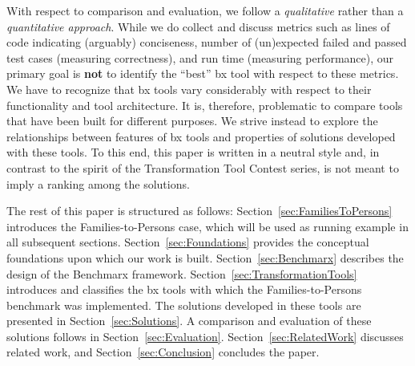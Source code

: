 With respect to comparison and evaluation, we follow a \emph{qualitative} rather than a \emph{quantitative approach}. 
While we do collect and discuss metrics such as lines of code indicating (arguably) conciseness, number of (un)expected failed and passed test cases (measuring correctness), and run time (measuring performance), our primary goal is \textbf{not} to identify the ``best'' bx tool with respect to these metrics. 
We have to recognize that bx tools vary considerably with respect to their functionality and tool architecture. 
It is, therefore, problematic to compare tools that have been built for different purposes. 
We strive instead to explore the relationships between features of bx tools and properties of solutions developed with these tools. 
%
To this end, this paper is written in a neutral style and, in contrast to the spirit of the Transformation Tool Contest series, is not meant to imply a ranking among the solutions. 

The rest of this paper is structured as follows: Section~\ref{sec:FamiliesToPersons} introduces the Families-to-Persons case, which will be used as running example in all subsequent sections. 
Section~\ref{sec:Foundations} provides the conceptual foundations upon which our work is built. 
Section~\ref{sec:Benchmarx} describes the design of the Benchmarx framework. 
Section~\ref{sec:TransformationTools} introduces and classifies the bx tools with which the Families-to-Persons benchmark was implemented. The solutions developed in these tools are presented in Section~\ref{sec:Solutions}. 
A comparison and evaluation of these solutions follows in Section~\ref{sec:Evaluation}. 
Section~\ref{sec:RelatedWork} discusses related work, and Section~\ref{sec:Conclusion} concludes the paper.